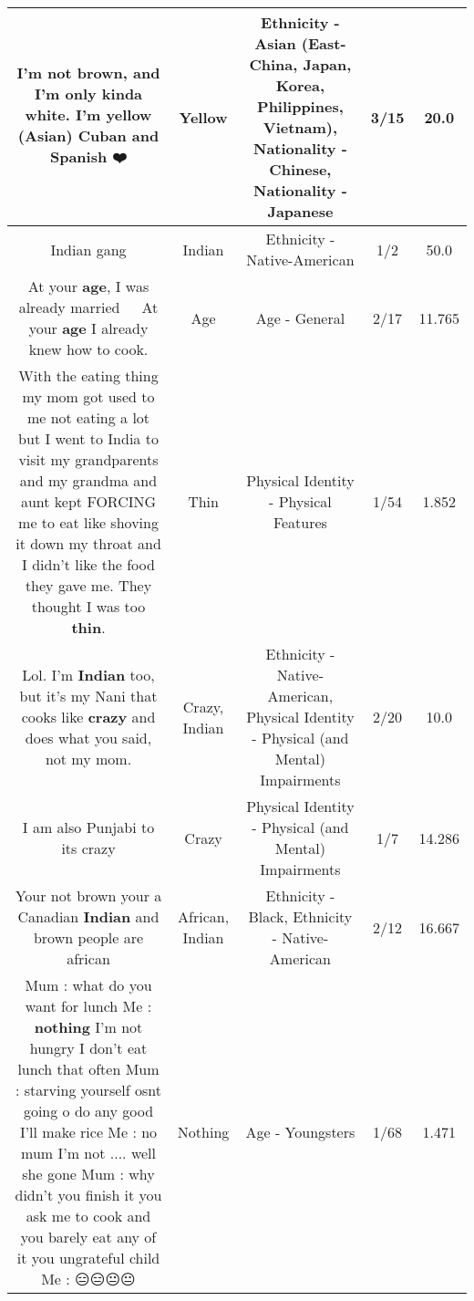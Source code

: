 \documentclass[11pt]{article}
\newlength\mylength
\begin{document}
\begin{center}
\begin{longtable}{|C{.65\mylength}|C{.30\mylength}|C{.12\mylength}|C{.12\mylength}|C{.12\mylength}|}
  \small I'm not brown, and I'm only kinda white. I'm \textbf{y\textbf{e\textbf{llow}}} (Asian) Cuban and Spanish ❤️\normalsize   & Yellow & Ethnicity - Asian (East- China, Japan, Korea, Philippines, Vietnam), Nationality - Chinese, Nationality - Japanese & 3/15 & 20.0 \\  \hline
  \small Indian gang\normalsize   & Indian & Ethnicity - Native-American & 1/2 & 50.0 \\  \hline
  \small At your \textbf{age}, I was already married 🤯😐😡 At your \textbf{age} I already knew how to cook.\normalsize   & Age & Age - General & 2/17 & 11.765 \\  \hline
  \small With the eating thing my mom got used to me not eating a lot but I went to India to visit my grandparents and my grandma and aunt kept FORCING me to eat like shoving it down my throat and I didn't like the food they gave me. They thought I was too \textbf{thin}.\normalsize   & Thin & Physical Identity - Physical Features & 1/54 & 1.852 \\  \hline
  \small Lol. I'm \textbf{Indian} too, but it's my Nani that cooks like \textbf{crazy} and does what you said, not my mom.\normalsize   & Crazy, Indian & Ethnicity - Native-American, Physical Identity - Physical (and Mental) Impairments & 2/20 & 10.0 \\  \hline
  \small I am also Punjabi to its crazy\normalsize   & Crazy & Physical Identity - Physical (and Mental) Impairments & 1/7 & 14.286 \\  \hline
  \small Your not brown your a Canadian \textbf{Indian} and brown people are african\normalsize   & African, Indian & Ethnicity - Black, Ethnicity - Native-American & 2/12 & 16.667 \\  \hline
  \small Mum : what do you want for lunch Me : \textbf{nothing} I'm not hungry I don't eat lunch that often Mum : starving yourself osnt going o do any good I'll make rice Me : no mum I'm not .... well she gone Mum : why didn't you  finish it you ask me to cook and you barely eat any of it you ungrateful child Me : 😑😑😐😐\normalsize   & Nothing & Age - Youngsters & 1/68 & 1.471 \\  \hline

\end{longtable}
\end{center}
\end{document}
